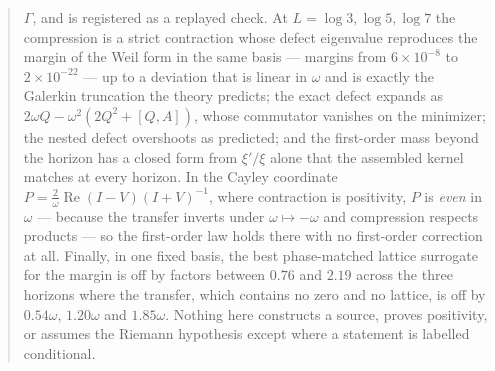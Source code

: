 \documentclass[11pt]{article}
\numberwithin{equation}{section}
\theoremstyle{definition}
\theoremstyle{remark}
\begin{document}
\begin{abstract}
$\Gamma$, and is registered as a replayed check. At $L=\log3,\log5,\log7$ the
compression is a strict contraction whose defect eigenvalue reproduces the
margin of the Weil form in the same basis --- margins from $6\times10^{-8}$ to
$2\times10^{-22}$ --- up to a deviation that is linear in $\omega$ and is
exactly the Galerkin truncation the theory predicts; the exact defect expands as
$2\omega Q-\omega^2(2Q^2+[Q,A])$, whose commutator vanishes on the minimizer;
the nested defect overshoots as predicted; and the first-order mass beyond the
horizon has a closed form from $\xi'/\xi$ alone that the assembled kernel
matches at every horizon. In the Cayley coordinate $P=\frac2\omega\operatorname{Re}(I-V)(I+V)^{-1}$,
where contraction is positivity, $P$ is \emph{even} in $\omega$ --- because the
transfer inverts under $\omega\mapsto-\omega$ and compression respects products
--- so the first-order law holds there with no first-order correction at all.
Finally, in one fixed basis, the best phase-matched lattice surrogate for the
margin is off by factors between $0.76$ and $2.19$ across the three horizons
where the transfer, which contains no zero and no lattice, is off by
$0.54\omega$, $1.20\omega$ and $1.85\omega$. Nothing here constructs a source,
proves positivity, or assumes the Riemann hypothesis except where a statement is
labelled conditional.
\end{abstract}

\clearpage
{\small\tableofcontents}
\clearpage






\appendix


\clearpage
{}
{}

\end{document}
